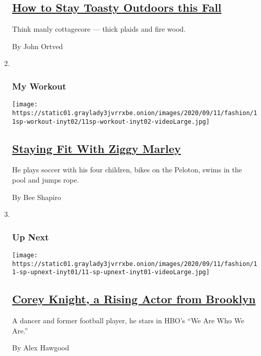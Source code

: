 \begin{enumerate}
  \hypertarget{how-to-stay-toasty-outdoors-this-fall}{%
  \subsection{\texorpdfstring{\href{/2020/09/11/fashion/mens-style/how-to-stay-toasty-outdoors-this-fall.html}{How
  to Stay Toasty Outdoors this
  Fall}}{How to Stay Toasty Outdoors this Fall}}\label{how-to-stay-toasty-outdoors-this-fall}}

  Think manly cottagecore --- thick plaids and fire wood.

  By John Ortved
\item ~
  \hypertarget{my-workout}{%
  \subsubsection{My Workout}\label{my-workout}}

  \texttt{[image: https://static01.graylady3jvrrxbe.onion/images/2020/09/11/fashion/11sp-workout-inyt02/11sp-workout-inyt02-videoLarge.jpg]}

  \hypertarget{staying-fit-with-ziggy-marley}{%
  \subsection{\texorpdfstring{\href{/2020/09/11/fashion/mens-style/staying-fit-with-ziggy-marley.html}{Staying
  Fit With Ziggy
  Marley}}{Staying Fit With Ziggy Marley}}\label{staying-fit-with-ziggy-marley}}

  He plays soccer with his four children, bikes on the Peloton, swims in
  the pool and jumps rope.

  By Bee Shapiro
\item ~
  \hypertarget{up-next}{%
  \subsubsection{Up Next}\label{up-next}}

  \texttt{[image: https://static01.graylady3jvrrxbe.onion/images/2020/09/11/fashion/11-sp-upnext-inyt01/11-sp-upnext-inyt01-videoLarge.jpg]}

  \hypertarget{corey-knight-a-rising-actor-from-brooklyn}{%
  \subsection{\texorpdfstring{\href{/2020/09/11/style/corey-knight-a-rising-actor-from-brooklyn.html}{Corey
  Knight, a Rising Actor from
  Brooklyn}}{Corey Knight, a Rising Actor from Brooklyn}}\label{corey-knight-a-rising-actor-from-brooklyn}}

  A dancer and former football player, he stars in HBO's ``We Are Who We
  Are.''

  By Alex Hawgood
\end{enumerate}

